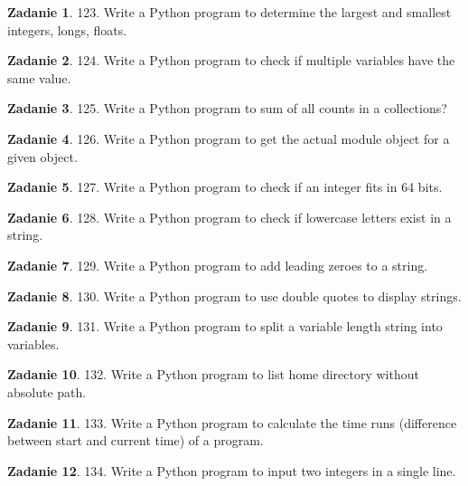 \documentclass[11pt]{article}
\theoremstyle{definition}
\newtheorem{zadanie}{Zadanie}
\begin{document}
\begin{zadanie}
123. Write a Python program to determine the largest and smallest integers, longs, floats.
\end{zadanie}

\begin{zadanie}
124. Write a Python program to check if multiple variables have the same value.
\end{zadanie}

\begin{zadanie}
125. Write a Python program to sum of all counts in a collections?
\end{zadanie}

\begin{zadanie}
126. Write a Python program to get the actual module object for a given object.
\end{zadanie}

\begin{zadanie}
127. Write a Python program to check if an integer fits in 64 bits.
\end{zadanie}

\begin{zadanie}
128. Write a Python program to check if lowercase letters exist in a string.
\end{zadanie}

\begin{zadanie}
129. Write a Python program to add leading zeroes to a string.
\end{zadanie}

\begin{zadanie}
130. Write a Python program to use double quotes to display strings.
\end{zadanie}

\begin{zadanie}
131. Write a Python program to split a variable length string into variables.
\end{zadanie}

\begin{zadanie}
132. Write a Python program to list home directory without absolute path.
\end{zadanie}

\begin{zadanie}
133. Write a Python program to calculate the time runs (difference between start and current time) of a program.
\end{zadanie}

\begin{zadanie}
134. Write a Python program to input two integers in a single line.
\end{zadanie}
\end{document}
